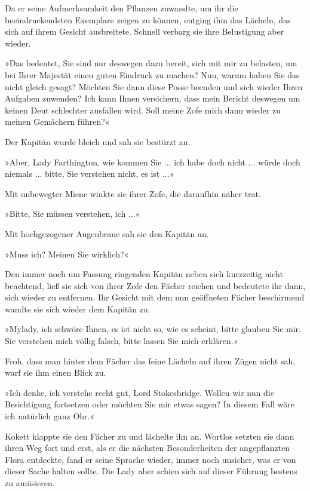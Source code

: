 Da er seine Aufmerksamkeit den Pflanzen zuwandte, um ihr die
beeindruckendsten Exemplare zeigen zu können, entging ihm das
Lächeln, das sich auf ihrem Gesicht ausbreitete. Schnell verbarg
sie ihre Belustigung aber wieder.

»Das bedeutet, Sie sind nur deswegen dazu bereit, sich mit mir zu
belasten, um bei Ihrer Majestät einen guten Eindruck zu machen?
Nun, warum haben Sie das nicht gleich gesagt? Möchten Sie dann
diese Posse beenden und sich wieder Ihren Aufgaben zuwenden? Ich
kann Ihnen versichern, dass mein Bericht deswegen um keinen Deut
schlechter ausfallen wird. Soll meine Zofe mich dann wieder zu
meinen Gemächern führen?«

Der Kapitän wurde bleich und sah sie bestürzt an.

»Aber, Lady Farthington, wie kommen Sie ... ich habe doch nicht ...
würde doch niemals ... bitte, Sie verstehen nicht, es ist ...«

Mit unbewegter Miene winkte sie ihrer Zofe, die daraufhin näher
trat.

»Bitte, Sie müssen verstehen, ich ...«

Mit hochgezogener Augenbraue sah sie den Kapitän an.

»Muss ich? Meinen Sie wirklich?«

Den immer noch um Fassung ringenden Kapitän neben sich kurzzeitig
nicht beachtend, ließ sie sich von ihrer Zofe den Fächer reichen
und bedeutete ihr dann, sich wieder zu entfernen. Ihr Gesicht mit
dem nun geöffneten Fächer beschirmend wandte sie sich wieder dem
Kapitän zu.

»Mylady, ich schwöre Ihnen, es ist nicht so, wie es scheint, bitte
glauben Sie mir. Sie verstehen mich völlig falsch, bitte lassen Sie
mich erklären.«

Froh, dass man hinter dem Fächer das feine Lächeln auf ihren Zügen
nicht sah, warf sie ihm einen Blick zu.

»Ich denke, ich verstehe recht gut, Lord Stokesbridge. Wollen wir
nun die Besichtigung fortsetzen oder möchten Sie mir etwas sagen?
In diesem Fall wäre ich natürlich ganz Ohr.«

Kokett klappte sie den Fächer zu und lächelte ihn an. Wortlos
setzten sie dann ihren Weg fort und erst, als er die nächsten
Besonderheiten der angepflanzten Flora entdeckte, fand er seine
Sprache wieder, immer noch unsicher, was er von dieser Sache halten
sollte. Die Lady aber schien sich auf dieser Führung bestens zu
amüsieren.

\bigpar

